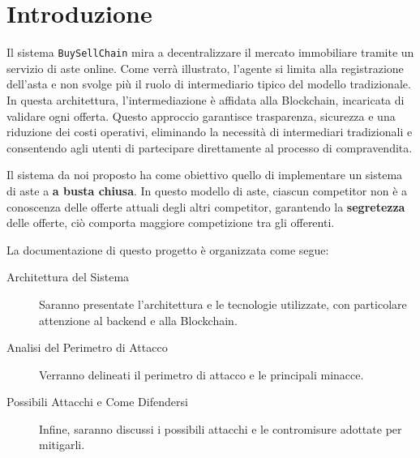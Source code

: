 \chapter{Introduzione}

Il sistema \texttt{BuySellChain} mira a decentralizzare il mercato immobiliare tramite un servizio di aste online. Come verrà illustrato, l'agente si limita alla registrazione dell'asta e non svolge più il ruolo di intermediario tipico del modello tradizionale. In questa architettura, l'intermediazione è affidata alla Blockchain, incaricata di validare ogni offerta. Questo approccio garantisce trasparenza, sicurezza e una riduzione dei costi operativi, eliminando la necessità di intermediari tradizionali e consentendo agli utenti di partecipare direttamente al processo di compravendita.

Il sistema da noi proposto ha come obiettivo quello di implementare un sistema di aste a \textbf{a busta chiusa}. In questo modello di aste, ciascun competitor non è a conoscenza delle offerte attuali degli altri competitor, garantendo la \textbf{segretezza} delle offerte, ciò comporta maggiore competizione tra gli offerenti. 

La documentazione di questo progetto è organizzata come segue:

\begin{description}
    \item[Architettura del Sistema] Saranno presentate l'architettura e le tecnologie utilizzate, con particolare attenzione al backend e alla Blockchain.
    \item[Analisi del Perimetro di Attacco] Verranno delineati il perimetro di attacco e le principali minacce.
    \item[Possibili Attacchi e Come Difendersi] Infine, saranno discussi i possibili attacchi e le contromisure adottate per mitigarli.
\end{description}